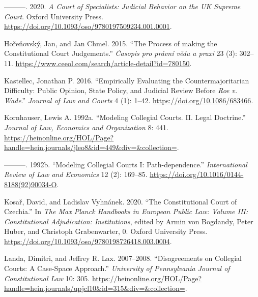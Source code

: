 \documentclass[
  11pt,
]{article}
\newlength{\cslhangindent}
\newenvironment{CSLReferences}[2] %
 {%
  \setlength{\parindent}{0pt}
  \ifodd #1 \everypar{\setlength{\hangindent}{\cslhangindent}}\ignorespaces\fi
  \ifnum #2 > 0
  \setlength{\parskip}{#2\baselineskip}
  \fi
 }%
 {}
\begin{document}
\begin{CSLReferences}{1}{0}
\leavevmode{}%
---------. 2020. \emph{A {Court} of {Specialists}: {Judicial Behavior}
on the {UK Supreme Court}}. {Oxford University Press}.
\url{https://doi.org/10.1093/oso/9780197509234.001.0001}.

\leavevmode{}%
Hořeňovský, Jan, and Jan Chmel. 2015. {``The Process of making the
Constitutional Court Judgements.''} \emph{Časopis pro právní vědu a
praxi} 23 (3): 302--11.
\url{https://www.ceeol.com/search/article-detail?id=780150}.

\leavevmode{}%
Kastellec, Jonathan P. 2016. {``Empirically {Evaluating} the
{Countermajoritarian Difficulty}: {Public Opinion}, {State Policy}, and
{Judicial Review} Before {\emph{Roe}}{ \emph{v.} }{\emph{Wade}}.''}
\emph{Journal of Law and Courts} 4 (1): 1--42.
\url{https://doi.org/10.1086/683466}.

\leavevmode{}%
Kornhauser, Lewis A. 1992a. {``Modeling {Collegial Courts}. {II}. {Legal
Doctrine}.''} \emph{Journal of Law, Economics and Organization} 8: 441.
\url{https://heinonline.org/HOL/Page?handle=hein.journals/jleo8&id=449&div=&collection=}.

\leavevmode{}%
---------. 1992b. {``Modeling Collegial Courts {I}:
{Path-dependence}.''} \emph{International Review of Law and Economics}
12 (2): 169--85. \url{https://doi.org/10.1016/0144-8188(92)90034-O}.

\leavevmode{}%
Kosař, David, and Ladislav Vyhnánek. 2020. {``The {Constitutional Court}
of {Czechia}.''} In \emph{The {Max Planck Handbooks} in {European Public
Law}: {Volume III}: {Constitutional Adjudication}: {Institutions}},
edited by Armin von Bogdandy, Peter Huber, and Christoph Grabenwarter,
0. {Oxford University Press}.
\url{https://doi.org/10.1093/oso/9780198726418.003.0004}.

\leavevmode{}%
Landa, Dimitri, and Jeffrey R. Lax. 2007--2008. {``Disagreements on
{Collegial Courts}: {A Case-Space Approach}.''} \emph{University of
Pennsylvania Journal of Constitutional Law} 10: 305.
\url{https://heinonline.org/HOL/Page?handle=hein.journals/upjcl10&id=315&div=&collection=}.


\end{CSLReferences}
\end{document}
